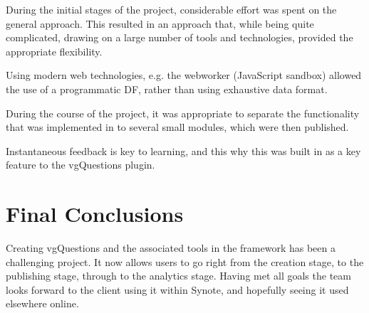 
During the initial stages of the project, considerable effort was spent on the general approach. This resulted in an approach that, while being quite complicated, drawing on a large number of tools and technologies, provided the appropriate flexibility.

Using modern web technologies, e.g. the \gls{webworker} (JavaScript sandbox) allowed the use of a programmatic \gls{DF}, rather than using exhaustive data format.

During the course of the project, it was appropriate to separate the functionality that was implemented in to several small modules, which were then published.

Instantaneous feedback is key to learning, and this why this was built in as a key feature to the \gls{vgQuestions} plugin.

\section{Final Conclusions}

Creating \gls{vgQuestions} and the associated tools in the framework has been a challenging project. It now allows users to go right from the creation stage, to the publishing stage, through to the analytics stage. Having met all goals the team looks forward to the client using it within Synote, and hopefully seeing it used elsewhere online.


